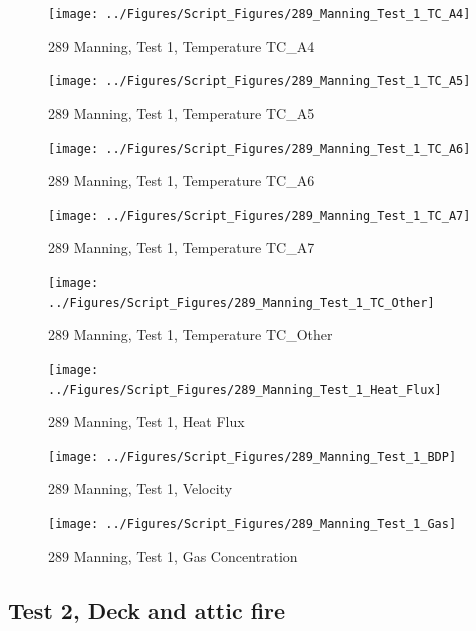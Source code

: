 \documentclass[12pt,oneside]{book}
\begin{document}
\begin{figure}[!ht]
\texttt{[image: ../Figures/Script\_Figures/289\_Manning\_Test\_1\_TC\_A4]}
\caption{289 Manning, Test 1, Temperature TC\_A4}
\label{fig:289_Manning_Test_1_TC_A4}
\end{figure}

\begin{figure}[!ht]
\texttt{[image: ../Figures/Script\_Figures/289\_Manning\_Test\_1\_TC\_A5]}
\caption{289 Manning, Test 1, Temperature TC\_A5}
\label{fig:289_Manning_Test_1_TC_A5}
\end{figure}

\begin{figure}[!ht]
\texttt{[image: ../Figures/Script\_Figures/289\_Manning\_Test\_1\_TC\_A6]}
\caption{289 Manning, Test 1, Temperature TC\_A6}
\label{fig:289_Manning_Test_1_TC_A6}
\end{figure}

\begin{figure}[!ht]
\texttt{[image: ../Figures/Script\_Figures/289\_Manning\_Test\_1\_TC\_A7]}
\caption{289 Manning, Test 1, Temperature TC\_A7}
\label{fig:289_Manning_Test_1_TC_A7}
\end{figure}

\begin{figure}[!ht]
\texttt{[image: ../Figures/Script\_Figures/289\_Manning\_Test\_1\_TC\_Other]}
\caption{289 Manning, Test 1, Temperature TC\_Other}
\label{fig:289_Manning_Test_1_TC_Other}
\end{figure}

\begin{figure}[!ht]
\texttt{[image: ../Figures/Script\_Figures/289\_Manning\_Test\_1\_Heat\_Flux]}
\caption{289 Manning, Test 1, Heat Flux}
\label{fig:289_Manning_Test_1_Heat_Flux}
\end{figure}

\begin{figure}[!ht]
\texttt{[image: ../Figures/Script\_Figures/289\_Manning\_Test\_1\_BDP]}
\caption{289 Manning, Test 1, Velocity}
\label{fig:289_Manning_Test_1_BDP}
\end{figure}

\begin{figure}[!ht]
\texttt{[image: ../Figures/Script\_Figures/289\_Manning\_Test\_1\_Gas]}
\caption{289 Manning, Test 1, Gas Concentration}
\label{fig:289_Manning_Test_1_Gas}
\end{figure}


\clearpage


\subsection{Test 2, Deck and attic fire}
\end{document}
